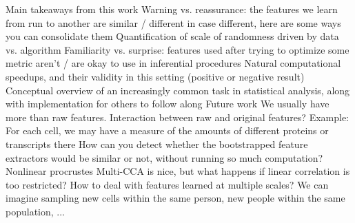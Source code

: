 \documentclass[11pt]{article}
\begin{document}
\begin{outline}
  \1 Main takeaways from this work
    \2 Warning vs. reassurance: the features we learn from run to another are
    similar / different
      \3 in case different, here are some ways you can consolidate them
      \3 Quantification of scale of randomness driven by data vs. algorithm
    \2 Familiarity vs. surprise: features used after trying to optimize some
    metric aren't / are okay to use in inferential procedures
    \2 Natural computational speedups, and their validity in this setting
    (positive or negative result)
    \2 Conceptual overview of an increasingly common task in statistical
    analysis, along with implementation for others to follow along
  \1 Future work
    \2 We usually have more than raw features. Interaction between raw and
    original features?
      \3 Example: For each cell, we may have a measure of the amounts of
      different proteins or transcripts there
    \2 How can you detect whether the bootstrapped feature extractors would be
    similar or not, without running so much computation?
    \2 Nonlinear procrustes
      \3 Multi-CCA is nice, but what happens if linear correlation is too
      restricted?
    \2 How to deal with features learned at multiple scales? We can imagine
    sampling new cells within the same person, new people within the same
    population, ...
\end{outline}



\end{document}
